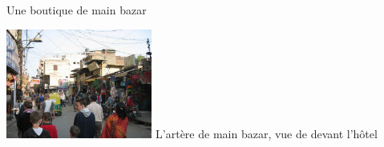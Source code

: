 \begin{multicols}{2}
Une boutique de main bazar

\hspace*{-0.65cm}
\includegraphics[width=4.8cm]{articles/Arrivee-en-inde/rue.jpg}
L'artère de main bazar, vue de devant l'hôtel

\end{multicols}



